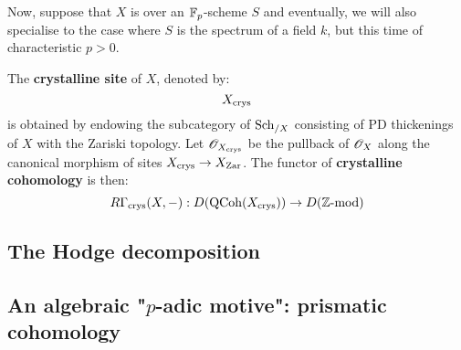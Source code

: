         Now, suppose that $X$ is over an $\mathbb{F}_p$-scheme $S$ and eventually, we will also specialise to the case where $S$ is the spectrum of a field $k$, but this time of characteristic $p > 0$. 
        \begin{definition} \label{def: crystalline_cohomology}
            The \textbf{crystalline site} of $X$, denoted by:
                $$X_{\mathrm{crys}}$$
            is obtained by endowing the subcategory of $\mathrm{Sch}_{/X}$ consisting of PD thickenings of $X$ with the Zariski topology. Let $\mathscr{O}_{X_{\mathrm{crys}}}$ be the pullback of $\mathscr{O}_X$ along the canonical morphism of sites $X_{\mathrm{crys}} \to X_{\mathrm{Zar}}$. The functor of \textbf{crystalline cohomology} is then:
                $$R\Gamma_{\mathrm{crys}}(X, -): D(\mathrm{QCoh}(X_{\mathrm{crys}})) \to D(\mathbb{Z}\text{-}\mathrm{mod})$$
        \end{definition}
        \begin{lemma}
            
        \end{lemma}
        \begin{theorem}
            
        \end{theorem}
        \begin{theorem}
            
        \end{theorem}

    \subsection{The Hodge decomposition}
        

    \subsection{\texorpdfstring{An algebraic "$p$-adic motive"}{}: prismatic cohomology}